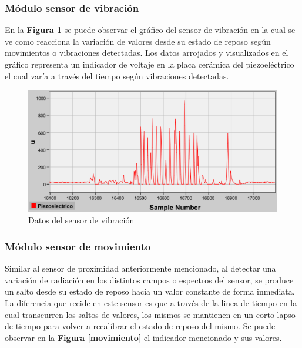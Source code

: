 \documentclass{IEEEtran}
\begin{document}
			\subsubsection{Módulo sensor de vibración}

				En la \textbf{Figura \ref{piezo}} se puede observar el gráfico del sensor de vibración en la cual se ve como reacciona la variación de valores desde su estado de reposo según movimientos o vibraciones detectadas. Los datos arrojados y visualizados en el gráfico representa un indicador de voltaje en la placa cerámica del piezoeléctrico el cual varía a través del tiempo según vibraciones detectadas. 

				\begin{figure}
					\centering
					\includegraphics[width=1\linewidth]{piezo}
					\caption{Datos del sensor de vibración}
					\label{piezo}
				\end{figure}

			\subsubsection{Módulo sensor de movimiento}
				
				Similar al sensor de proximidad anteriormente mencionado, al detectar una variación de radiación en los distintos campos o espectros del sensor, se produce un salto desde su estado de reposo hacia un valor constante de forma inmediata. La diferencia que recide en este sensor es que a través de la linea de tiempo en la cual transcurren los saltos de valores, los mismos se mantienen en un corto lapso de tiempo para volver a recalibrar el estado de reposo del mismo. Se puede observar en la \textbf{Figura \ref{movimiento}} el indicador mencionado y sus valores.
\end{document}
